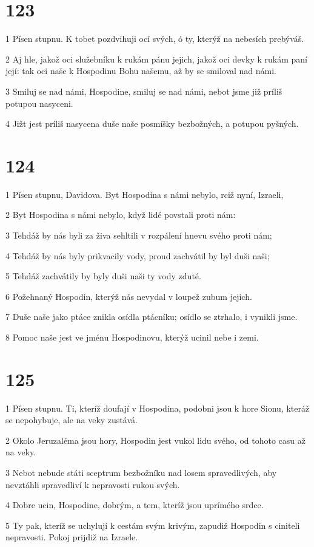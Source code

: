 \chapter{123}

\par 1 Písen stupnu. K tobet pozdvihuji ocí svých, ó ty, kterýž na nebesích prebýváš.
\par 2 Aj hle, jakož oci služebníku k rukám pánu jejich, jakož oci devky k rukám paní její: tak oci naše k Hospodinu Bohu našemu, až by se smiloval nad námi.
\par 3 Smiluj se nad námi, Hospodine, smiluj se nad námi, nebot jsme již príliš potupou nasyceni.
\par 4 Jižt jest príliš nasycena duše naše posmíšky bezbožných, a potupou pyšných.

\chapter{124}

\par 1 Písen stupnu, Davidova. Byt Hospodina s námi nebylo, rciž nyní, Izraeli,
\par 2 Byt Hospodina s námi nebylo, když lidé povstali proti nám:
\par 3 Tehdáž by nás byli za živa sehltili v rozpálení hnevu svého proti nám;
\par 4 Tehdáž by nás byly prikvacily vody, proud zachvátil by byl duši naši;
\par 5 Tehdáž zachvátily by byly duši naši ty vody zduté.
\par 6 Požehnaný Hospodin, kterýž nás nevydal v loupež zubum jejich.
\par 7 Duše naše jako ptáce znikla osídla ptácníku; osídlo se ztrhalo, i vynikli jsme.
\par 8 Pomoc naše jest ve jménu Hospodinovu, kterýž ucinil nebe i zemi.

\chapter{125}

\par 1 Písen stupnu. Ti, kteríž doufají v Hospodina, podobni jsou k hore Sionu, kteráž se nepohybuje, ale na veky zustává.
\par 2 Okolo Jeruzaléma jsou hory, Hospodin jest vukol lidu svého, od tohoto casu až na veky.
\par 3 Nebot nebude státi sceptrum bezbožníku nad losem spravedlivých, aby nevztáhli spravedliví k nepravosti rukou svých.
\par 4 Dobre ucin, Hospodine, dobrým, a tem, kteríž jsou uprímého srdce.
\par 5 Ty pak, kteríž se uchylují k cestám svým krivým, zapudiž Hospodin s ciniteli nepravosti. Pokoj prijdiž na Izraele.


